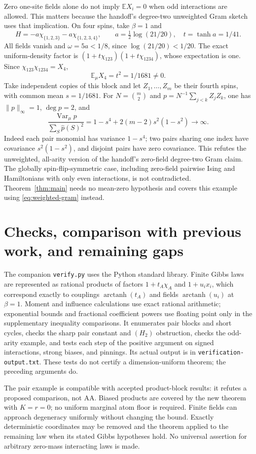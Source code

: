 \documentclass[11pt]{article}
\newcommand{\E}{\mathbb E}
\newcommand{\Var}{\operatorname{Var}}
\begin{document}
Zero one-site fields alone do not imply $\E X_i=0$ when odd
interactions are allowed. This matters because the handoff's
degree-two unweighted Gram sketch uses that implication.
On four spins, take $\beta=1$ and
\[
 H=-a\chi_{\{1,2,3\}}-a\chi_{\{1,2,3,4\}},\qquad
 a=\tfrac12\log(21/20),\quad t=\tanh a=1/41.
\]
All fields vanish and
$\omega=5a<1/8$, since $\log(21/20)<1/20$.
The exact uniform-density factor is
$(1+t\chi_{123})(1+t\chi_{1234})$, whose expectation is one.
Since $\chi_{123}\chi_{1234}=X_4$,
\[
 \E_\mu X_4=t^2=1/1681\ne0.
\]
Take independent copies of this block and let $Z_1,\ldots,Z_m$
be their fourth spins, with common mean $s=1/1681$. For
$N=\binom m2$ and $p=N^{-1}\sum_{j<k}Z_jZ_k$, one has
$\|p\|_\infty=1$, $\deg p=2$, and
\[
 \frac{\Var_\mu p}{\sum_S\widehat p(S)^2}
 =1-s^4+2(m-2)s^2(1-s^2)\longrightarrow\infty.
\]
Indeed each pair monomial has variance $1-s^4$; two pairs sharing
one index have covariance $s^2(1-s^2)$, and disjoint pairs have
zero covariance. This refutes the unweighted, all-arity version
of the handoff's zero-field degree-two Gram claim. The globally
spin-flip-symmetric case, including zero-field pairwise Ising and
Hamiltonians with only even interactions, is not contradicted.
Theorem~\ref{thm:main} needs no mean-zero hypothesis and covers
this example using \eqref{eq:weighted-gram} instead.

\section{Checks, comparison with previous work, and remaining gaps}

The companion \texttt{verify.py} uses the Python standard library.
Finite Gibbs laws are represented as rational products of factors
$1+t_A\chi_A$ and $1+u_ix_i$, which correspond exactly to
couplings $\operatorname{arctanh}(t_A)$ and fields
$\operatorname{arctanh}(u_i)$ at $\beta=1$.
Moment and influence calculations use exact rational arithmetic;
exponential bounds and fractional coefficient powers use floating
point only in the supplementary inequality comparisons.
It enumerates pair blocks and short cycles, checks the sharp pair
constant and $(H_2)$ obstruction, checks the odd-arity example,
and tests each step of the positive argument on signed interactions,
strong biases, and pinnings. Its actual output is in
\texttt{verification-output.txt}. These tests do not certify a
dimension-uniform theorem; the preceding arguments do.

The pair example is compatible with accepted product-block results:
it refutes a proposed comparison, not AA. Biased products are covered
by the new theorem with $K=r=0$; no uniform marginal atom floor is
required. Finite fields can approach degeneracy uniformly without
changing the bound. Exactly deterministic coordinates may be removed
and the theorem applied to the remaining law when its stated Gibbs
hypotheses hold. No universal assertion for arbitrary zero-mass
interacting laws is made.
\end{document}
